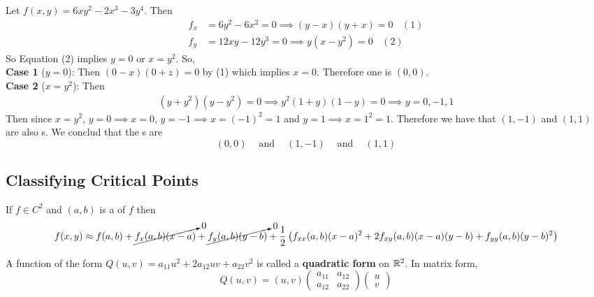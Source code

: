 \documentclass[english, 11pt]{article}
\begin{document}
\begin{exmp}
  Let $f(x,y) = 6xy^2 - 2x^3 - 3y^4$. Then
  \begin{align*}
    f_x & = 6y^2 - 6x^2 = 0 \implies (y-x)(y+x) = 0 \ \ \ \ (1) \\
    f_y & = 12xy - 12y^3 = 0 \implies y(x-y^2) = 0 \ \ \ \ (2)
  \end{align*}
  So Equation (2) implies $y = 0$ or $x = y^2$. So, \\
  \textbf{Case 1} ($y = 0$): Then $(0-x)(0+z) = 0$ by (1) which implies $x=0$. Therefore one  is $(0,0)$. \\
  \textbf{Case 2} ($x = y^2$): Then
  \begin{align*}
    (y+y^2)(y-y^2) = 0 \implies y^2(1 + y)(1-y) = 0 \implies y = 0,-1,1
  \end{align*}
  Then since $x = y^2$, $y = 0 \implies x = 0$, $y = -1 \implies x = (-1)^2 = 1$ and $y = 1 \implies x = 1^2 = 1$. Therefore we have that $(1,-1)$ and $(1,1)$ are also s. We conclud that the s are
  \[ \left( 0, 0 \right) \ \ \ \ \mbox{ and } \ \ \ \ \left( 1, -1 \right)  \ \ \ \ \mbox{ and } \ \ \ \ \left( 1, 1 \right) \]
\end{exmp}

\subsection{Classifying Critical Points}

If $f \in C^2$ and $(a,b)$ is a  of $f$ then
\[ f(x,y) \approx f(a,b) + \cancelto{0}{f_x(a,b)(x-a)} + \cancelto{0}{f_y(a,b)(y-b)} + \frac{1}{2}\left( f_{xx}(a,b)(x-a)^2 + 2f_{xy}(a,b)(x-a)(y-b) + f_{yy}(a,b)(y-b)^2 \right) \]

\begin{defn}\label{quadratic form}
A function of the form $Q(u,v) = a_{11}u^2 + 2a_{12}uv + a_{22}v^2$ is called a \textbf{quadratic form} on ${\mathbb{R}}^2$. In matrix form,
\[ Q(u,v) = (u,v)\left( \begin{matrix} a_{11} & a_{12} \\ a_{12} & a_{22} \end{matrix} \right) \left( \begin{matrix}
  u \\ v
\end{matrix} \right) \]
\end{defn}
\end{document}
